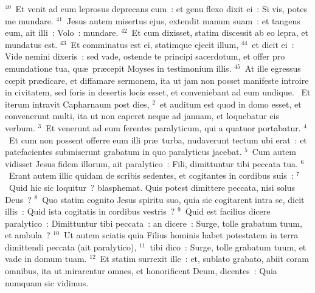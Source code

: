 ${}^{40}$~Et venit ad eum leprosus deprecans eum~: et genu flexo dixit ei~: Si vis, potes me mundare.
${}^{41}$~Jesus autem misertus ejus, extendit manum suam~: et tangens eum, ait illi~: Volo~: mundare.
${}^{42}$~Et cum dixisset, statim discessit ab eo lepra, et mundatus est.
${}^{43}$~Et comminatus est ei, statimque ejecit illum,
${}^{44}$~et dicit ei~: Vide nemini dixeris~: sed vade, ostende te principi sacerdotum, et offer pro emundatione tua, qu\ae\ pr\ae cepit Moyses in testimonium illis.
${}^{45}$~At ille egressus cœpit pr\ae dicare, et diffamare sermonem, ita ut jam non posset manifeste introire in civitatem, sed foris in desertis locis esset, et conveniebant ad eum undique.
~\lettrine[lines=10,image=true,loversize=0.05,lraise=-0.03]{E}{}t iterum intravit Capharnaum post dies,
${}^{2}$~et auditum est quod in domo esset, et convenerunt multi, ita ut non caperet neque ad januam, et loquebatur eis verbum.
${}^{3}$~Et venerunt ad eum ferentes paralyticum, qui a quatuor portabatur.
${}^{4}$~Et cum non possent offerre eum illi pr\ae\ turba, nudaverunt tectum ubi erat~: et patefacientes submiserunt grabatum in quo paralyticus jacebat.
${}^{5}$~Cum autem vidisset Jesus fidem illorum, ait paralytico~: Fili, dimittuntur tibi peccata tua.
${}^{6}$~Erant autem illic quidam de scribis sedentes, et cogitantes in cordibus suis~:
${}^{7}$~Quid hic sic loquitur~? blasphemat. Quis potest dimittere peccata, nisi solus Deus~?
${}^{8}$~Quo statim cognito Jesus spiritu suo, quia sic cogitarent intra se, dicit illis~: Quid ista cogitatis in cordibus vestris~?
${}^{9}$~Quid est facilius dicere paralytico~: Dimittuntur tibi peccata~: an dicere~: Surge, tolle grabatum tuum, et ambula~?
${}^{10}$~Ut autem sciatis quia Filius hominis habet potestatem in terra dimittendi peccata (ait paralytico),
${}^{11}$~tibi dico~: Surge, tolle grabatum tuum, et vade in domum tuam.
${}^{12}$~Et statim surrexit ille~: et, sublato grabato, abiit coram omnibus, ita ut mirarentur omnes, et honorificent Deum, dicentes~: Quia numquam sic vidimus.



